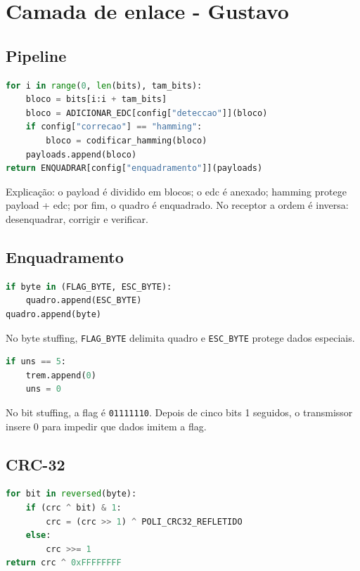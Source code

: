 \documentclass[10pt,a4paper]{article}
\begin{document}
\section{Camada de enlace - Gustavo}

\subsection{Pipeline}

\begin{lstlisting}[language=Python]
for i in range(0, len(bits), tam_bits):
    bloco = bits[i:i + tam_bits]
    bloco = ADICIONAR_EDC[config["deteccao"]](bloco)
    if config["correcao"] == "hamming":
        bloco = codificar_hamming(bloco)
    payloads.append(bloco)
return ENQUADRAR[config["enquadramento"]](payloads)
\end{lstlisting}

Explicação: o payload é dividido em blocos; o edc é anexado; hamming protege
payload + edc; por fim, o quadro é enquadrado. No receptor a ordem é inversa:
desenquadrar, corrigir e verificar.

\subsection{Enquadramento}

\begin{lstlisting}[language=Python]
if byte in (FLAG_BYTE, ESC_BYTE):
    quadro.append(ESC_BYTE)
quadro.append(byte)
\end{lstlisting}

No byte stuffing, \texttt{FLAG\_BYTE} delimita quadro e \texttt{ESC\_BYTE}
protege dados especiais.

\begin{lstlisting}[language=Python]
if uns == 5:
    trem.append(0)
    uns = 0
\end{lstlisting}

No bit stuffing, a flag é \texttt{01111110}. Depois de cinco bits 1 seguidos,
o transmissor insere 0 para impedir que dados imitem a flag.

\subsection{CRC-32}

\begin{lstlisting}[language=Python]
for bit in reversed(byte):
    if (crc ^ bit) & 1:
        crc = (crc >> 1) ^ POLI_CRC32_REFLETIDO
    else:
        crc >>= 1
return crc ^ 0xFFFFFFFF
\end{lstlisting}
\end{document}
